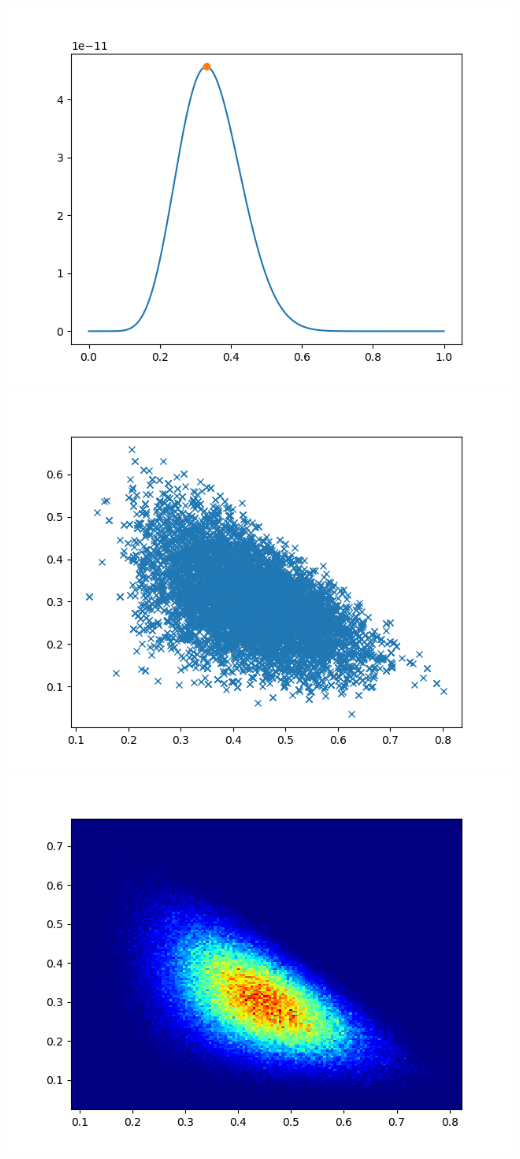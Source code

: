 \documentclass[pt12]{article}
\begin{document}
\newpage

\begin{center}
\includegraphics[scale=0.5]{hip35.png}\\
\includegraphics[scale=0.5]{sc35.png}\\
\includegraphics[scale=0.5]{den35.png}\\
\end{center}
\end{document}

